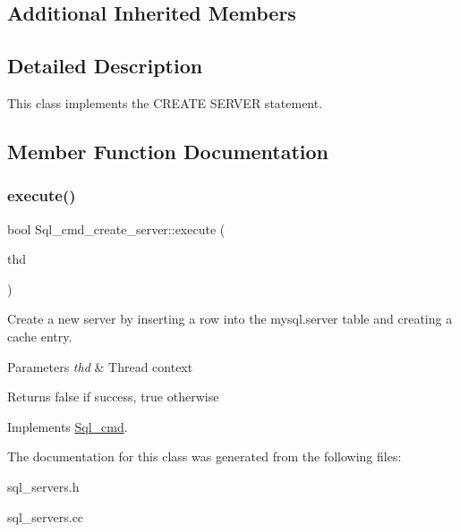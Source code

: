 \subsection*{Additional Inherited Members}


\subsection{Detailed Description}
This class implements the C\+R\+E\+A\+TE S\+E\+R\+V\+ER statement. 

\subsection{Member Function Documentation}
\mbox{\label{classSql__cmd__create__server_a8e7f8717451abfb04ef6ddbacfe76428}} 
\subsubsection{\texorpdfstring{execute()}{execute()}}
{\footnotesize\ttfamily bool Sql\+\_\+cmd\+\_\+create\+\_\+server\+::execute (\begin{DoxyParamCaption}\item[{T\+HD $\ast$}]{thd }\end{DoxyParamCaption})\hspace{0.3cm}{\ttfamily [virtual]}}

Create a new server by inserting a row into the mysql.\+server table and creating a cache entry.


\begin{DoxyParams}{Parameters}
{\em thd} & Thread context\\
\hline
\end{DoxyParams}
\begin{DoxyReturn}{Returns}
false if success, true otherwise 
\end{DoxyReturn}


Implements \mbox{\hyperlink{classSql__cmd_a213367b79b551296fbb7790f2a3732fb}{Sql\+\_\+cmd}}.



The documentation for this class was generated from the following files\+:\begin{DoxyCompactItemize}
\item 
sql\+\_\+servers.\+h\item 
sql\+\_\+servers.\+cc\end{DoxyCompactItemize}
